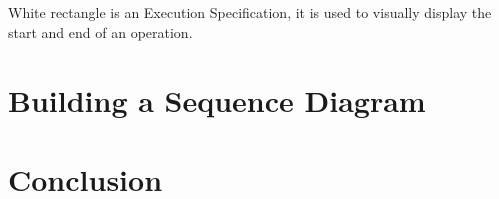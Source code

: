 \documentclass[10pt,twoside,slovak,a4paper]{article}
\begin{document}
White rectangle is an Execution Specification, it is used to visually display the start and end of an operation.
\section{Building a Sequence Diagram} \label{building}





\section{Conclusion} \label{Conclusion} %







\end{document}
